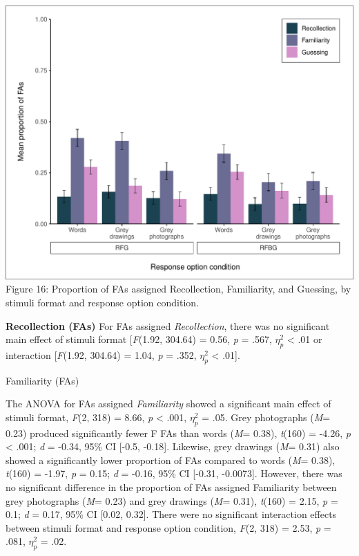 \documentclass[
  11pt,
]{article}
\begin{document}
\includegraphics{R--Thesis_files/figure-latex/unnamed-chunk-50-1.pdf}
Figure 16: Proportion of FAs assigned Recollection, Familiarity, and
Guessing, by stimuli format and response option condition.

\textbf{Recollection (FAs)} For FAs assigned \emph{Recollection}, there
was no significant main effect of stimuli format {[}\emph{F}(1.92,
304.64) = 0.56, \emph{p} = .567, \(\eta^2_p\) \textless{} .01 or
interaction {[}\emph{F}(1.92, 304.64) = 1.04, \emph{p} = .352,
\(\eta^2_p\) \textless{} .01{]}.

Familiarity (FAs)

The ANOVA for FAs assigned \emph{Familiarity} showed a significant main
effect of stimuli format, \emph{F}(2, 318) = 8.66, \emph{p} \textless{}
.001, \(\eta^2_p\) = .05. Grey photographs (\emph{M}= 0.23) produced
significantly fewer F FAs than words (\emph{M}= 0.38), \emph{t}(160) =
-4.26, \emph{p} \textless{} .001; \emph{d} = -0.34, 95\% CI {[}-0.5,
-0.18{]}. Likewise, grey drawings (\emph{M}= 0.31) also showed a
significantly lower proportion of FAs compared to words (\emph{M}=
0.38), \emph{t}(160) = -1.97, \emph{p} = 0.15; \emph{d} = -0.16, 95\% CI
{[}-0.31, -0.0073{]}. However, there was no significant difference in
the proportion of FAs assigned Familiarity between grey photographs
(\emph{M}= 0.23) and grey drawings (\emph{M}= 0.31), \emph{t}(160) =
2.15, \emph{p} = 0.1; \emph{d} = 0.17, 95\% CI {[}0.02, 0.32{]}. There
were no significant interaction effects between stimuli format and
response option condition, \emph{F}(2, 318) = 2.53, \emph{p} = .081,
\(\eta^2_p\) = .02.
\end{document}
